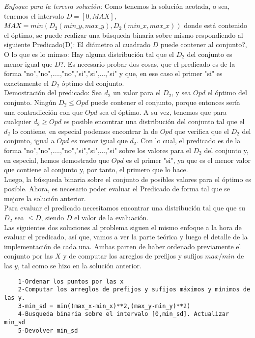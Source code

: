 \documentclass{article}
\begin{document}
\textit{Enfoque para la tercera soluci\'on:}  Como tenemos la soluci\'on acotada, o sea, tenemos el intervalo $D=[0,MAX]$, $MAX=min(D_2(min\_y,max\_y),D_2(min\_x, max\_x))$ donde est\'a contenido el \'optimo, se puede realizar una b\'usqueda binaria sobre mismo respondiendo al siguiente Predicado(D): El di\'ametro al cuadrado $D$ puede contener al conjunto?, O lo que es lo mimso: Hay alguna distribuci\'on tal que el $D_2$ del conjunto es menor igual que $D$?. Es necesario probar dos cosas, que el predicado es de la forma "no","no",....,"no","si","si",...,"si" y que, en ese caso el primer "si" es exactamente el $D_2$ \'optimo del conjunto.\\

Demostraci\'on del predicado: Sea $d_2$ un valor para el $D_2$, y sea $Opd$ el \'optimo del conjunto. Ning\'un $D_2 \leq Opd$ puede contener el conjunto, porque entonces ser\'ia  una contradicci\'on con que $Opd$ sea el \'optimo. A su vez, tenemos que para cualquier $d_2\geq Opd$ es posible encontrar una distribuci\'on del conjunto tal que el $d_2$ lo contiene, en especial podemos encontrar la de $Opd$ que verifica que el $D_2$ del conjunto, igual a $Opd$ es menor igual que $d_2$. Con lo cual, el predicado es de la forma "no","no",....,"no","si","si",...,"si" sobre los valores para el $D_2$ del conjunto y, en especial, hemos demostrado que $Opd$ es el primer "si", ya que es el menor valor que contiene al conjunto y, por tanto, el primero que lo hace.\\

Luego, la b\'usqueda binaria sobre el conjunto de posibles valores para el \'optimo es posible. Ahora, es necesario poder evaluar el Predicado de forma tal que se mejore la soluci\'on anterior.\\

Para evaluar el predicado necesitamos encontrar una distribuci\'on tal que que su $D_2$ sea $\leq D$, siendo $D$ el valor de la evaluaci\'on.\\

Las siguientes dos soluciones al problema siguen el mismo enfoque a la hora de evaluar el predicado, as\'i que, vamos a ver la parte te\'orica y luego el detalle de la implementaci\'on de cada una. Ambas parten de haber ordenado previamente el conjunto por las $X$ y de computar los arreglos de prefijos y sufijos $max/min$ de las $y$, tal como se hizo en la soluci\'on anterior.\\

\begin{verbatim}
    1-Ordenar los puntos por las x
    2-Computar los arreglos de prefijos y sufijos máximos y mínimos de las y.
    3-min_sd = min((max_x-min_x)**2,(max_y-min_y)**2)
    4-Busqueda binaria sobre el intervalo [0,min_sd]. Actualizar min_sd
    5-Devolver min_sd
\end{verbatim}
\end{document}
